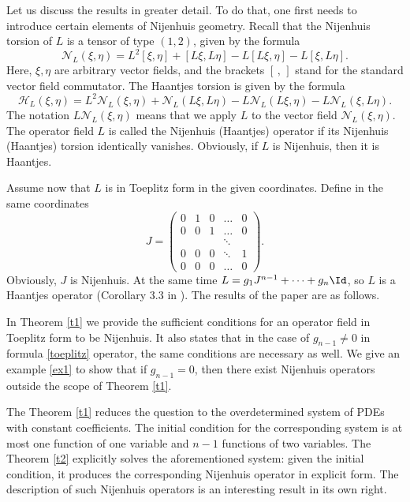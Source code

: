 \documentclass[12pt]{article}
\theoremstyle{remark}
\begin{document}
Let us discuss the results in greater detail. To do that, one first needs to introduce certain elements of Nijenhuis geometry. Recall that the Nijenhuis torsion of $L$ is a tensor of type $(1, 2)$, given by the formula
\begin{equation}\label{nij}
\mathcal N_L(\xi, \eta) = L^2[\xi, \eta] + [L\xi, L\eta] - L[L\xi, \eta] - L[\xi, L\eta].    
\end{equation}
Here, $\xi, \eta$ are arbitrary vector fields, and the brackets $[\, , \,]$ stand for the standard vector field commutator. The Haantjes torsion is given by the formula
\begin{equation}\label{haa}
\mathcal H_L(\xi, \eta) = L^2 \mathcal N_L(\xi, \eta) + \mathcal N_L(L\xi, L\eta) - L\mathcal N_L(L\xi, \eta) - L\mathcal N_L(\xi, L\eta).    
\end{equation}
The notation $L \mathcal N_L(\xi, \eta)$ means that we apply $L$ to the vector field $\mathcal N_L(\xi, \eta)$. The operator field $L$ is called the Nijenhuis (Haantjes) operator if its Nijenhuis (Haantjes) torsion identically vanishes. Obviously, if $L$ is Nijenhuis, then it is Haantjes. 

Assume now that $L$ is in Toeplitz form in the given coordinates. Define in the same coordinates 
\begin{equation}\label{jordan}
J = \left( \begin{array}{ccccc}
     0 & 1 & 0 & \dots & 0 \\
     0 & 0 & 1 & \dots & 0 \\
      & & & \ddots & \\
      0 & 0 & 0 & \ddots & 1\\
      0 & 0 & 0 & \dots & 0
\end{array}\right).    
\end{equation}
Obviously, $J$ is Nijenhuis. At the same time $L = g_1 J^{n - 1} + \dots + g_n \Id$, so $L$ is a Haantjes operator (Corollary 3.3 in \cite{bg}). The results of the paper are as follows.

In Theorem \ref{t1} we provide the sufficient conditions for an operator field in Toeplitz form to be Nijenhuis. It also states that in the case of $g_{n - 1} \neq 0$ in formula \eqref{toeplitz} operator, the same conditions are necessary as well. We give an example \ref{ex1} to show that if $g_{n - 1} = 0$, then there exist Nijenhuis operators outside the scope of Theorem \ref{t1}.

The Theorem \ref{t1} reduces the question to the overdetermined system of PDEs with constant coefficients. The initial condition for the corresponding system is at most one function of one variable and $n - 1$ functions of two variables. The Theorem \ref{t2} explicitly solves the aforementioned system: given the initial condition, it produces the corresponding Nijenhuis operator in explicit form. The description of such Nijenhuis operators is an interesting result in its own right.
\end{document}
